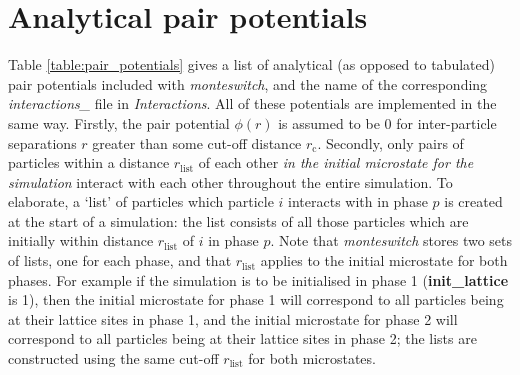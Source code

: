 \documentclass{report}
\begin{document}
\section{Analytical pair potentials}\label{section:pair_potentials}
Table \ref{table:pair_potentials} gives a list of analytical (as opposed to tabulated) 
pair potentials included with \emph{monteswitch}, and the name of the corresponding
\emph{interactions\_} file in \emph{Interactions}. All of these potentials are implemented in the same way.
Firstly, the pair potential $\phi(r)$ is assumed to be 0 for inter-particle separations $r$ greater than some cut-off distance $r_{\text{c}}$.
Secondly, only pairs of particles within a distance $r_{\text{list}}$ of each other \emph{in the initial microstate for the simulation} interact
with each other throughout the entire simulation. To elaborate, a `list' of particles which particle $i$ interacts with in phase $p$ is created at 
the start of a simulation: the list consists of all those particles which are initially within distance $r_{\text{list}}$ of $i$ in phase $p$. Note that
\emph{monteswitch} stores two sets of lists, one for each phase, and that $r_{\text{list}}$ applies to the initial microstate for both phases. For
example if the simulation is to be initialised in phase 1 (\textbf{init\_lattice} is 1), then the initial microstate for phase 1 will correspond to
all particles being at their lattice sites in phase 1, and the initial microstate for phase 2 will correspond to all particles being at their lattice 
sites in phase 2; the lists are constructed using the same cut-off $r_{\text{list}}$ for both microstates.
\end{document}
